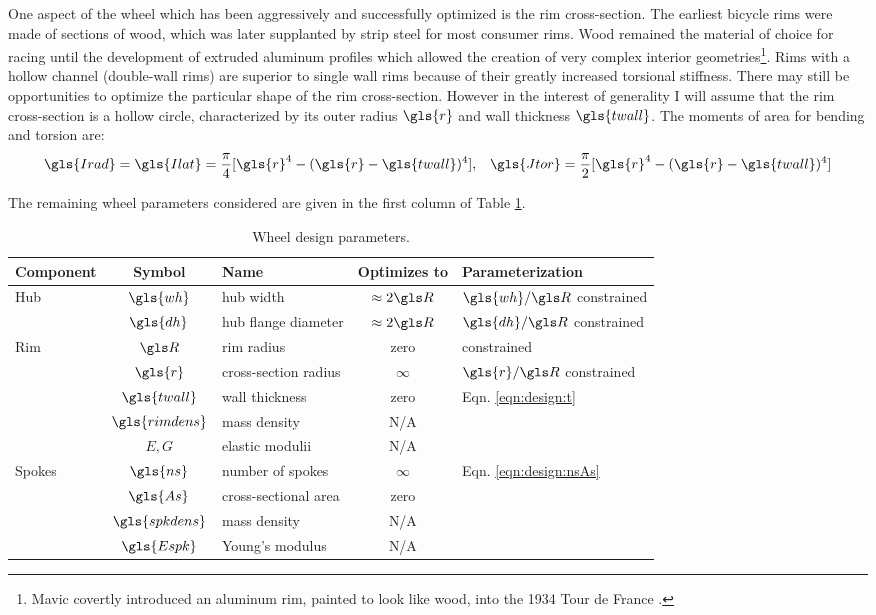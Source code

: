 \documentclass[\rootdir/thesis.tex]{subfiles}
\begin{document}
One aspect of the wheel which has been aggressively and successfully optimized is the rim cross-section. The earliest bicycle rims were made of sections of wood, which was later supplanted by strip steel for most consumer rims. Wood remained the material of choice for racing until the development of extruded aluminum profiles which allowed the creation of very complex interior geometries\footnote{Mavic covertly introduced an aluminum rim, painted to look like wood, into the 1934 Tour de France \cite{Herlihy2004}.}. Rims with a hollow channel (double-wall rims) are superior to single wall rims because of their greatly increased torsional stiffness. There may still be opportunities to optimize the particular shape of the rim cross-section. However in the interest of generality I will assume that the rim cross-section is a hollow circle, characterized by its outer radius $\gls{r}$ and wall thickness $\gls{twall}$. The moments of area for bending and torsion are:
\begin{equation}
\gls{Irad} = \gls{Ilat} = \frac{\pi}{4} [\gls{r}^4 - (\gls{r}-\gls{twall})^4], \,\,\,\,\,
\gls{Jtor} = \frac{\pi}{2} [\gls{r}^4 - (\gls{r}-\gls{twall})^4]
\end{equation}

The remaining wheel parameters considered are given in the first column of Table \ref{tab:design_space}.

\begin{table}
\caption{Wheel design parameters.}
\label{tab:design_space}
\begin{tabular}{lclcl}
\hline
\bf Component & \bf Symbol & \bf Name & \bf Optimizes to & \bf Parameterization\\
\hline
\multirow{2}{*}{Hub} & $\gls{wh}$ & hub width            & $\approx 2\R$ & $\gls{wh}/\R$ constrained\\
                     & $\gls{dh}$ & hub flange diameter  & $\approx 2\R$ & $\gls{dh}/\R$ constrained\\
\hline
\multirow{5}{*}{Rim} & $\R$            & rim radius           & zero     & constrained\\
                     & $\gls{r}$       & cross-section radius & $\infty$ & $\gls{r}/\R$ constrained\\
                     & $\gls{twall}$   & wall thickness       & zero     & Eqn. \eqref{eqn:design:t}\\
                     & $\gls{rimdens}$ & mass density         & N/A\\
                     & $E,G$           & elastic modulii      & N/A\\
\hline
\multirow{4}{*}{Spokes} & $\gls{ns}$      & number of spokes  & $\infty$ & \multirow{2}{*}{Eqn. \eqref{eqn:design:nsAs}}\\
                        & $\gls{As}$      & cross-sectional area & zero\\
                        & $\gls{spkdens}$ & mass density   & N/A\\
                        & $\gls{Espk}$    & Young's modulus & N/A\\
\hline
\end{tabular}
\end{table}
\end{document}
